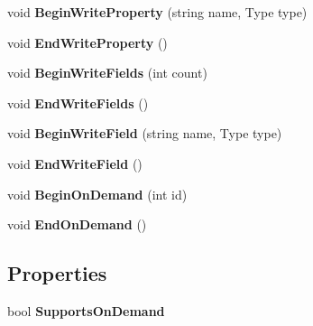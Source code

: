 \begin{DoxyCompactItemize}
void {\bfseries Begin\+Write\+Property} (string name, Type type)
\item 
\mbox{\label{interface_serialization_1_1_i_storage_a978b5e23e42f8db83095b9dfd1102528}} 
void {\bfseries End\+Write\+Property} ()
\item 
\mbox{\label{interface_serialization_1_1_i_storage_a101b3acfd63c956c27cd9d45e2c4d7c1}} 
void {\bfseries Begin\+Write\+Fields} (int count)
\item 
\mbox{\label{interface_serialization_1_1_i_storage_a8584d495d876a2b05ba671de46e33006}} 
void {\bfseries End\+Write\+Fields} ()
\item 
\mbox{\label{interface_serialization_1_1_i_storage_a70f3334f87463abfe43c5d256c2486fe}} 
void {\bfseries Begin\+Write\+Field} (string name, Type type)
\item 
\mbox{\label{interface_serialization_1_1_i_storage_a0e0c8f96ea2316bc9efc73cd27176897}} 
void {\bfseries End\+Write\+Field} ()
\item 
\mbox{\label{interface_serialization_1_1_i_storage_aa32f1588f15cdce160d47b06b1c8ec15}} 
void {\bfseries Begin\+On\+Demand} (int id)
\item 
\mbox{\label{interface_serialization_1_1_i_storage_a40adb4b1e7b959e0b3baa509d3ce16f7}} 
void {\bfseries End\+On\+Demand} ()
\end{DoxyCompactItemize}
\subsection*{Properties}
\begin{DoxyCompactItemize}
\item 
\mbox{\label{interface_serialization_1_1_i_storage_a6096e94c37b632da7f415a4697f80f32}} 
bool {\bfseries Supports\+On\+Demand}
\end{DoxyCompactItemize}


